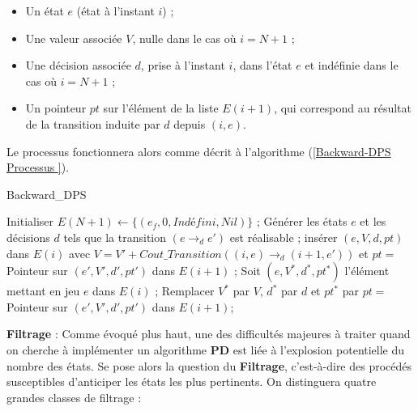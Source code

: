 \begin{itemize}[label=$\square$]
	\item 	Un état $e $ (état à l'instant $i$) ;
	\item 	Une valeur associée $V$, nulle dans le cas où $i = N+1$ ;
	\item 	Une décision associée $d$, prise à l'instant $i$, dans l'état $e$ et indéfinie dans le cas où $i = N+1$ ;
	\item 	Un pointeur $pt$ sur l'élément de la liste $E(i+1)$, qui correspond au résultat de la transition induite par $d$ depuis $(i, e)$.
\end{itemize}
Le processus fonctionnera alors comme décrit à l'algorithme (\ref{Backward-DPS Processus }).

\begin{algorithm} 
	\caption{Backward\_DPS }
	\label{Backward-DPS Processus }
	\begin{algorithmic}[1]
		\STATE Initialiser $E(N+1) \leftarrow \{(e_f, 0, Indéfini, Nil)\}$ ; 
		\vspace{0.2cm}
		\STATE Générer les états $e$ et les décisions $d$ tels que la transition $(e \rightarrow_{d} e')$ est réalisable ;
		\STATE insérer $(e, V, d, pt)$ dans $E(i)$ avec $V = V' + Cout\_Transition((i, e) \rightarrow_{d} (i+1, e'))$ et $pt =$ Pointeur sur $(e', V', d', pt')$ dans $E(i+1)$ ;
		\ELSE
		\STATE Soit $(e, V^*, d^*, pt^*)$ l'élément mettant en jeu $e$ dans $E(i)$ ;
		\STATE Remplacer $V^*$ par $V$, $d^*$ par $d$ et $pt^*$ par $pt =$ Pointeur sur $(e', V', d', pt')$ dans $E(i+1)$; 
		\ENDIF
		\ENDIF
		\ENDFOR
		\ENDFOR
		\ENDFOR	
	\end{algorithmic}
\end{algorithm}

\textbf{	Filtrage } : Comme évoqué plus haut, une des difficultés majeures à traiter quand on cherche à implémenter un algorithme \textbf{PD} est liée à l'explosion potentielle du nombre des états. Se pose alors la question du \textbf{Filtrage}, c'est-à-dire des procédés susceptibles d'anticiper les états les plus pertinents. On distinguera quatre grandes classes de filtrage : 

